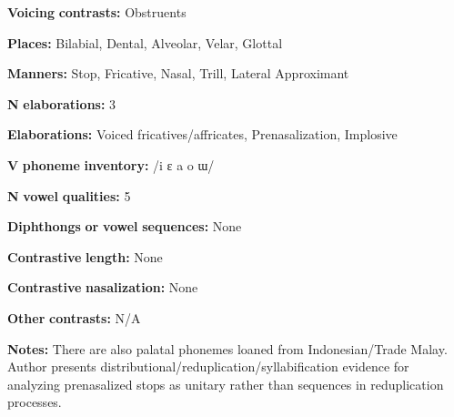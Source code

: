 \documentclass[output=paper]{langsci/langscibook}
\begin{document}
\begin{styleBody}
\textbf{Voicing} \textbf{contrasts:} Obstruents
\end{styleBody}

\begin{styleBody}
\textbf{Places:} Bilabial, Dental, Alveolar, Velar, Glottal
\end{styleBody}

\begin{styleBody}
\textbf{Manners:} Stop, Fricative, Nasal, Trill, Lateral Approximant
\end{styleBody}

\begin{styleBody}
\textbf{N} \textbf{elaborations:} 3
\end{styleBody}

\begin{styleBody}
\textbf{Elaborations:} Voiced fricatives/affricates, Prenasalization, Implosive
\end{styleBody}

\begin{styleBody}
\textbf{V} \textbf{phoneme} \textbf{inventory:} /i ɛ a o ɯ/
\end{styleBody}

\begin{styleBody}
\textbf{N} \textbf{vowel} \textbf{qualities:} 5
\end{styleBody}

\begin{styleBody}
\textbf{Diphthongs} \textbf{or} \textbf{vowel} \textbf{sequences:} None
\end{styleBody}

\begin{styleBody}
\textbf{Contrastive} \textbf{length:} None
\end{styleBody}

\begin{styleBody}
\textbf{Contrastive} \textbf{nasalization:} None
\end{styleBody}

\begin{styleBody}
\textbf{Other} \textbf{contrasts:} N/A
\end{styleBody}

\begin{styleBody}
\textbf{Notes:} There are also palatal phonemes loaned from Indonesian/Trade Malay. Author presents distributional/reduplication/syllabification evidence for analyzing prenasalized stops as unitary rather than sequences in reduplication processes.
\end{styleBody}
\end{document}
